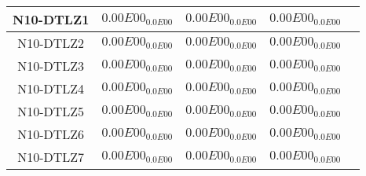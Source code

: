 \documentclass{article}
\begin{document}
\begin{table*}[ht!]
\begin{tabular}{|c||c||c||c||c|}
\hline
N10-DTLZ1 &\cellcolor{gray95}$0.00E00_{0.0E00}$ &\cellcolor{gray25}$0.00E00_{0.0E00}$ &$0.00E00_{0.0E00}$\\ 
\hline
N10-DTLZ2 &\cellcolor{gray95}$0.00E00_{0.0E00}$ &\cellcolor{gray25}$0.00E00_{0.0E00}$ &$0.00E00_{0.0E00}$\\ 
\hline
N10-DTLZ3 &\cellcolor{gray95}$0.00E00_{0.0E00}$ &\cellcolor{gray25}$0.00E00_{0.0E00}$ &$0.00E00_{0.0E00}$\\ 
\hline
N10-DTLZ4 &\cellcolor{gray95}$0.00E00_{0.0E00}$ &\cellcolor{gray25}$0.00E00_{0.0E00}$ &$0.00E00_{0.0E00}$\\ 
\hline
N10-DTLZ5 &\cellcolor{gray95}$0.00E00_{0.0E00}$ &\cellcolor{gray25}$0.00E00_{0.0E00}$ &$0.00E00_{0.0E00}$\\ 
\hline
N10-DTLZ6 &\cellcolor{gray95}$0.00E00_{0.0E00}$ &\cellcolor{gray25}$0.00E00_{0.0E00}$ &$0.00E00_{0.0E00}$\\ 
\hline
N10-DTLZ7 &\cellcolor{gray95}$0.00E00_{0.0E00}$ &\cellcolor{gray25}$0.00E00_{0.0E00}$ &$0.00E00_{0.0E00}$\\ 
\hline
\end{tabular}
\end{table*}
\end{document}

